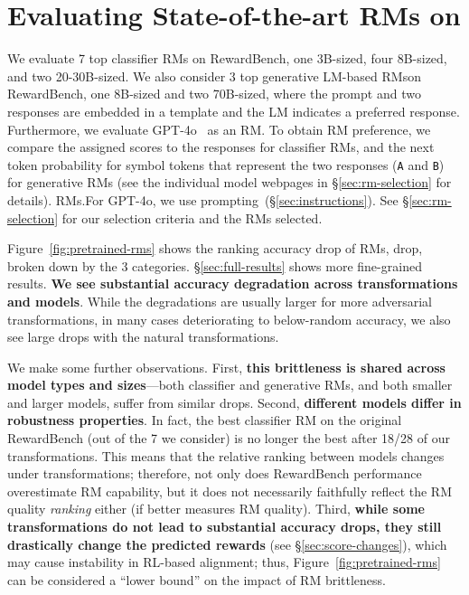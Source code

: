 \section{Evaluating State-of-the-art RMs on \benchmark} \label{sec:evaluation}



We evaluate 7 top classifier RMs on RewardBench, one 3B-sized, four 8B-sized, and two 20-30B-sized.
We also consider 3 top generative LM-based RMs\iflongversion on RewardBench\else\fi, one 8B-sized and two 70B-sized, where the prompt and two responses are embedded in a template and the LM indicates a preferred response.
Furthermore, we evaluate GPT-4o~\citep{gpt4} as an RM.
To obtain RM preference, we compare the assigned scores to the responses for classifier RMs, and the next token probability for symbol tokens that represent the two responses (\texttt{A} and \texttt{B}) for generative \iflongversion RMs (see the individual model webpages in \S\ref{sec:rm-selection} for details). \else RMs.\fi For GPT-4o, we use prompting~(\S\ref{sec:instructions}).
See \S\ref{sec:rm-selection} for our selection criteria and the RMs selected.



Figure~\ref{fig:pretrained-rms} shows the ranking accuracy
\iflongversion
drop of RMs,
\else
drop,
\fi
broken down by the 3 \benchmark categories.
\S\ref{sec:full-results} shows more fine-grained results.
\textbf{We see substantial
\iflongversion
accuracy
\fi
degradation across transformations and models}. While the degradations are usually larger for more adversarial transformations, in many cases deteriorating to below-random accuracy, we also see large drops with the natural transformations.

We make some further observations.
First, \textbf{this brittleness is shared across model types and sizes}---both classifier and generative RMs, and both smaller and larger models, suffer from similar drops.
Second, \textbf{different models differ in robustness properties}. 
In fact, the best classifier RM on the original RewardBench (out of the 7 we consider) is no longer the best after 18/28 of our transformations.
This means that the relative ranking between models changes under transformations; therefore, not only does RewardBench performance overestimate RM capability, but it does not necessarily faithfully reflect the RM quality \emph{ranking} either (if \benchmark better measures RM quality).
Third, \textbf{while some transformations do not lead to substantial accuracy drops, they still drastically change the predicted rewards} (see \S\ref{sec:score-changes}), which may cause instability in RL-based alignment; thus, Figure~\ref{fig:pretrained-rms} can be considered a ``lower bound'' on the impact of RM brittleness.
